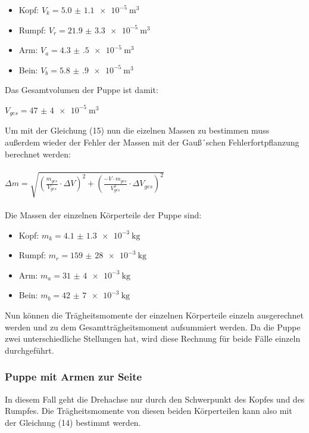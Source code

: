 \begin{itemize}
  \item Kopf: $V_k = \SI{5.0(11)e-5}{\meter\tothe{3}}$
  \item Rumpf: $V_r = \SI{21.9(33)e-5}{\meter\tothe{3}}$
  \item Arm: $V_a = \SI{4.3(5)e-5}{\meter\tothe{3}}$
  \item Bein: $V_b = \SI{5.8(9)e-5}{\meter\tothe{3}}$
\end{itemize}

Das Gesamtvolumen der Puppe ist damit:

\centerline{$V_{ges} = \SI{47(4)e-5}{\meter\tothe{3}}$}

Um mit der Gleichung (15) nun die eizelnen Massen zu bestimmen muss außerdem wieder
der Fehler der Massen mit der Gauß´schen Fehlerfortpflanzung berechnet werden:\\\\

$\Delta m = \sqrt{\left(\frac{m_{ges}}{V_{ges}} \cdot \Delta V \right)^2
  + \left(\frac{-V\cdot m_{ges}}{V_{ges}^2} \cdot \Delta V_{ges} \right)^2}$\\\\

Die Massen der einzelnen Körperteile der Puppe sind:

\begin{itemize}
  \item Kopf: $m_k = \SI{4.1(13)e-3}{\kilo\gram}$
  \item Rumpf: $m_r = \SI{159(28)e-3}{\kilo\gram}$
  \item Arm: $m_a = \SI{31(4)e-3}{\kilo\gram}$
  \item Bein: $m_b = \SI{42(7)e-3}{\kilo\gram}$
\end{itemize}

Nun können die Trägheitsmomente der einzelnen Körperteile einzeln ausgerechnet werden
und zu dem Gesamtträgheitsmoment aufsummiert werden. Da die Puppe zwei unterschiedliche
Stellungen hat, wird diese Rechnung für beide Fälle einzeln durchgeführt.

\subsubsection{Puppe mit Armen zur Seite}

In diesem Fall geht die Drehachse nur durch den Schwerpunkt des Kopfes und des Rumpfes.
Die Trägheitsmomente von diesen beiden Körperteilen kann also mit der Gleichung (14)
bestimmt werden.

